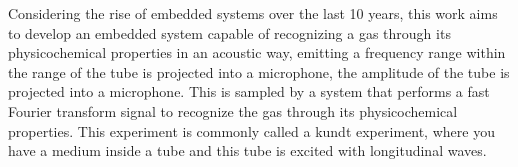 
\begin{abstractutfpr}%
    Considering the rise of embedded systems over the last 10 years, this work aims to develop an embedded system capable of recognizing a gas through its physicochemical properties in an acoustic way, emitting a frequency range within the range of the tube is projected into a microphone, the amplitude of the tube is projected into a microphone. This is sampled by a system that performs a fast Fourier transform signal to recognize the gas through its physicochemical properties. This experiment is commonly called a kundt experiment, where you have a medium inside a tube and this tube is excited with longitudinal waves.
\end{abstractutfpr}
